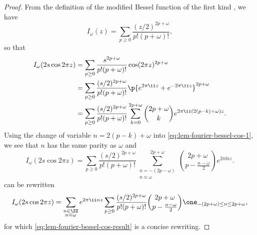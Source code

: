 \documentclass{article}
\begin{document}
\begin{proof}
  From the definition of the modified Bessel function of the first kind \cite[p.77, Eq. 2]{watsonTreatiseTheoryBessel1922}, we have
  \begin{equation*}
    I_\omega(z) = \sum_{p \geq 0} \frac{(z/2)^{2p + \omega}}{p! (p + \omega)!},
  \end{equation*}
  so that
  \begin{align}
    I_{\omega}(2s \cos 2\pi z)
     & = \sum_{p \geq 0} \frac{s^{2p + \omega}}{p! (p + \omega)!} \cos(2\pi z)^{2p + \omega} \notag                                                                                            \\
     & = \sum_{p \geq 0} \frac{(s/2)^{2p + \omega}}{p! (p + \omega)!} \p{e^{2\pi \ii z} + e^{-2\pi \ii z}}^{2p + \omega} \notag                                                                \\
     & = \sum_{p \geq 0} \frac{(s/2)^{2p + \omega}}{p! (p + \omega)!} \sum_{k = 0}^{2p + \omega} \binom{2p+\omega}{k} e^{2\pi \ii (2(p - k) + \omega) z}  \label{eq:lem-fourier-bessel-cos-1}.
  \end{align}
  Using the change of variable $n = 2(p-k) + \omega$ into \cref{eq:lem-fourier-bessel-cos-1}, we see that $n$ has the same parity as $\omega$ and
  \begin{equation}\label{eq:lem-fourier-bessel-cos-2}
    I_{\omega}(2s \cos 2\pi z)
    = \sum_{p \geq 0} \frac{(s/2)^{2p + \omega}}{p! (p + \omega)!} \sum_{\substack{n = - (2p - \omega) \\ n \equiv \omega}}^{2p + \omega} \binom{2p+\omega}{p - \frac{n - \omega}{2}} e^{2\pi \ii n z}.
  \end{equation}
   can be rewritten
  \begin{equation*}
    I_{\omega}(2s \cos 2\pi z)
    = \sum_{\substack{n \in \ZZ \\ n \equiv \omega}} e^{2\pi \ii n z} \sum_{p \geq 0} \frac{(s/2)^{2p + \omega}}{p! (p + \omega)!} \binom{2p + \omega}{p - \frac{n - \omega}{2}} \one_{-(2p + \omega) \leq n \leq 2p+\omega},
  \end{equation*}
  for which \cref{eq:lem-fourier-bessel-cos-result} is a concise rewriting.
\end{proof}
\end{document}
